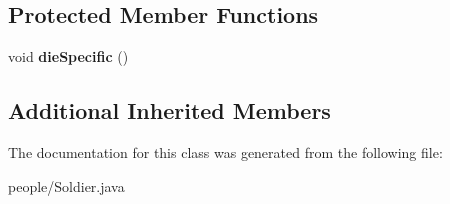\subsection*{Protected Member Functions}
\begin{DoxyCompactItemize}
\item 
void {\bfseries die\+Specific} ()\hypertarget{classpeople_1_1_soldier_a68fbd139a22d40e00d35c7236f526859}{}\label{classpeople_1_1_soldier_a68fbd139a22d40e00d35c7236f526859}

\end{DoxyCompactItemize}
\subsection*{Additional Inherited Members}


The documentation for this class was generated from the following file\+:\begin{DoxyCompactItemize}
\item 
people/Soldier.\+java\end{DoxyCompactItemize}
